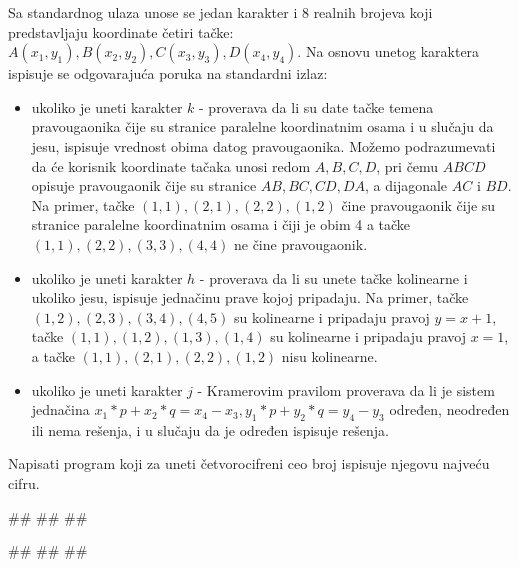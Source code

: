 \begin{Exercise}[difficulty=1, label=v1.2_14] 
Sa standardnog ulaza unose se jedan karakter i 8 realnih brojeva koji predstavljaju 
koordinate četiri tačke: $A(x_1, y_1), B(x_2, y_2), C(x_3, y_3), D(x_4, y_4)$. Na osnovu unetog karaktera 
ispisuje se odgovarajuća poruka na standardni izlaz:
\begin{itemize}
\item ukoliko je uneti karakter $k$ - proverava da li su date tačke temena pravougaonika čije su stranice paralelne koordinatnim osama i 
    u slučaju da jesu, ispisuje vrednost obima datog pravougaonika. Možemo podrazumevati da će korisnik koordinate tačaka 
    unosi redom $A,B,C,D$, pri čemu $ABCD$ opisuje pravougaonik čije su stranice $AB,BC,CD,DA$, a dijagonale $AC$ i $BD$. 
    Na primer, tačke $(1,1),(2,1),(2,2),(1,2)$ čine pravougaonik čije su stranice paralelne koordinatnim osama i čiji je obim 4
    a tačke $(1,1),(2,2),(3,3),(4,4)$ ne čine pravougaonik. 
\item ukoliko je uneti karakter $h$ - proverava da li su unete tačke kolinearne i ukoliko jesu, ispisuje jednačinu prave kojoj pripadaju. 
    Na primer, tačke $(1,2),(2,3),(3,4),(4,5)$ su kolinearne i pripadaju pravoj $y=x+1$, 
    tačke $(1,1),(1,2),(1,3),(1,4)$ su kolinearne i pripadaju pravoj $x=1$,
    a tačke $(1,1),(2,1),(2,2),(1,2)$ nisu kolinearne.
\item ukoliko je uneti karakter $j$ - Kramerovim pravilom proverava da li je sistem jednačina
$x_1 * p + x_2 * q = x_4 - x_3,y_1 * p + y_2 * q = y_4 - y_3$
    određen, neodređen ili nema rešenja, i u slučaju da je određen ispisuje rešenja.
\end{itemize} 
\end{Exercise}
\begin{Answer}[ref=v1.2_14]
\end{Answer}


\begin{Exercise}[label=p1.2_01] 
Napisati program koji za uneti četvorocifreni ceo broj ispisuje njegovu najveću cifru. 
 
\begin{miditest}
\begin{upotreba}{1}
#\naslovInt#
##
##
\end{upotreba}
\end{miditest}
\begin{miditest}
\begin{upotreba}{2}
#\naslovInt#
##
##
\end{upotreba}
\end{miditest}
\end{Exercise}
\begin{Answer}[ref=p1.2_01]
\end{Answer}

